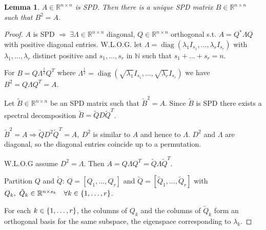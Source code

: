 \documentclass[12pt]{article}
\newtheorem{lemma}[theorem]{Lemma}
\theoremstyle{definition}
\theoremstyle{remark}
\numberwithin{equation}{section}
\newcommand{\R}{\mathbb{R}}
\newcommand{\N}{\mathbb{N}}
\DeclarePairedDelimiter{\set}{\{}{\}}
\DeclareMathOperator{\diag}{diag}
\begin{document}
\begin{lemma}
  $A \in \R^{n\times n}$ is SPD. Then there is a unique SPD matrix $B \in \R^{n\times n}$ such that $B^2 = A$.
\end{lemma}
\begin{proof}
  $A$ is SPD $\Rightarrow\ \exists \Lambda \in \R^{n\times n}$ diagonal, $Q \in \R^{n\times n}$ orthogonal s.t. $A = Q^* \Lambda Q$ with positive diagonal entries. W.L.O.G. let $\Lambda = \diag(\lambda_1 I_{s_1},\ldots,\lambda_r I_{s_r})$ with $\lambda_1, \ldots, \lambda_r$ distinct positive and $s_1, \ldots, s_r$ in $\N$ such that $s_1 + \ldots + s_r = n$.

  For $B=Q \Lambda^\frac{1}{2}Q^T$ where $\Lambda^\frac{1}{2} = \diag(\sqrt{\lambda_1} I_{s_1},\ldots,\sqrt{\lambda_r} I_{s_r})$ we have $B^2 = Q \Lambda Q^T = A$.

  Let $\tilde{B} \in \R^{n \times n}$ be an SPD matrix such that $\tilde{B}^2 = A$. Since $\tilde{B}$ is SPD there exists a spectral decomposition $\tilde{B} = \tilde{Q}D \tilde{Q}^T$.

  $\tilde{B}^2 = A \Rightarrow \tilde{Q}D^2 \tilde{Q}^T = A, \ D^2$ is similar to $A$ and hence to $\Lambda$. $D^2$ and $\Lambda$ are diagonal, so the diagonal entries coincide up to a permutation.

  W.L.O.G assume $D^2 = \Lambda$. Then $A = Q \Lambda Q^T = \tilde{Q} \Lambda \tilde{Q}^T$.

  Partition $Q$ and $\tilde{Q}$: $Q = [Q_1, \ldots, Q_r]$ and $\tilde{Q} = [\tilde{Q}_1, \ldots, \tilde{Q}_r]$ with $Q_k,\ \tilde{Q}_k \in \R^{n \times s_k} \quad \forall k \in \set{1,\ldots,r}$.

  For each $k \in \set{1,\ldots,r}$, the columns of $Q_k$ and the columns of $\tilde{Q}_k$ form an orthogonal basis for the same subspace, the eigenspace corresponding to $\lambda_k$.


\end{proof}
\end{document}
